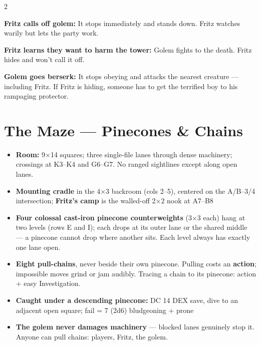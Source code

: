 \documentclass[10pt,letterpaper]{article}
\begin{document}
\begin{multicols}{2}
\vspace{4pt}

\textbf{Fritz calls off golem:} It stops immediately and stands down. Fritz watches warily but lets the party work.

\textbf{Fritz learns they want to harm the tower:} Golem fights to the death. Fritz hides and won't call it off.

\textbf{Golem goes berserk:} It stops obeying and attacks the nearest creature --- including Fritz. If Fritz is hiding, someone has to get the terrified boy to his rampaging protector.

\columnbreak

\section*{The Maze --- Pinecones \& Chains}
\begin{itemize}
\item \textbf{Room:} 9$\times$14 squares; three single-file lanes through dense machinery; crossings at K3--K4 and G6--G7. No ranged sightlines except along open lanes.
\item \textbf{Mounting cradle} in the 4$\times$3 backroom (cols 2--5), centered on the A/B--3/4 intersection; \textbf{Fritz's camp} is the walled-off 2$\times$2 nook at A7--B8
\item \textbf{Four colossal cast-iron pinecone counterweights} (3$\times$3 each) hang at two levels (rows E and I); each drops at its outer lane or the shared middle --- a pinecone cannot drop where another sits. Each level always has exactly one lane open.
\item \textbf{Eight pull-chains}, never beside their own pinecone. Pulling costs an \textbf{action}; impossible moves grind or jam audibly. Tracing a chain to its pinecone: action + easy Investigation.
\item \textbf{Caught under a descending pinecone:} DC 14 DEX save, dive to an adjacent open square; fail = 7 (2d6) bludgeoning + prone
\item \textbf{The golem never damages machinery} --- blocked lanes genuinely stop it. Anyone can pull chains: players, Fritz, the golem.
\end{itemize}


\end{multicols}
\end{document}
